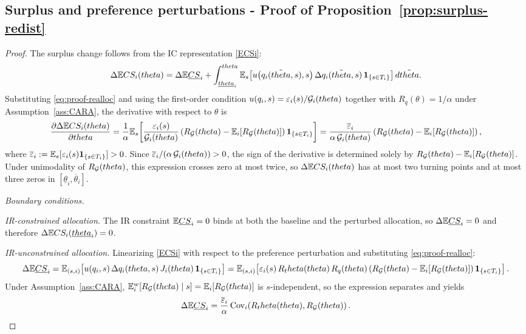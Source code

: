 \documentclass{class}
\begin{document}
\subsection{Surplus and preference perturbations - Proof of Proposition~\ref{prop:surplus-redist}}\label{proof:surplus-redist}


\begin{proof}
    
The surplus change follows from the IC representation \ref{ECSi}:
\[\Delta \mathbb{E} CS_i(theta) = \Delta\mathbb{E}\underline{CS}_i + \int_{\underline{theta}_i}^{theta}\mathbb{E}_s\!\left[u\!\left(q_i(\tilde{theta},s),s\right)\Delta q_i(\tilde{theta},s)\,\mathbf{1}_{\{s\in T_i\}}\right]d\tilde{theta}.\]
Substituting \ref{eq:proof-realloc} and using the first-order condition $u(q_i,s)=\varepsilon_i(s)/\mathcal{G}_i(theta)$ together with $R_q(\theta)=1/\alpha$ under Assumption~\ref{ass:CARA}, the derivative with respect to $\theta$ is
\[\frac{\partial\Delta \mathbb{E} CS_i(theta)}{\partial theta} = \frac{1}{\alpha}\mathbb{E}_s\!\left[\frac{\varepsilon_i(s)}{\mathcal{G}_i(theta)}\left(R_{\mathcal{G}}(theta)-\mathbb{E}_i[R_{\mathcal{G}}(theta)]\right)\mathbf{1}_{\{s\in T_i\}}\right] = \frac{\overline\varepsilon_i}{\alpha\,\mathcal{G}_i(theta)}\left(R_{\mathcal{G}}(theta)-\mathbb{E}_i[R_{\mathcal{G}}(theta)]\right),\]
where $\overline\varepsilon_i:=\mathbb{E}_s[\varepsilon_i(s)\mathbf{1}_{\{s\in T_i\}}]>0$. Since $\overline\varepsilon_i/(\alpha\,\mathcal{G}_i(theta))>0$, the sign of the derivative is determined solely by $R_{\mathcal{G}}(theta)-\mathbb{E}_i[R_{\mathcal{G}}(theta)]$. Under unimodality of $R_{\mathcal{G}}(theta)$, this expression crosses zero at most twice, so $\Delta \mathbb{E} CS_i(theta)$ has at most two turning points and at most three zeros in $[\underline\theta_i,\overline\theta_i]$.

\noindent\textit{Boundary conditions.}

\noindent\textit{IR-constrained allocation.} The IR constraint $\mathbb{E}\underline{CS}_i=0$ binds at both the baseline and the perturbed allocation, so $\Delta\mathbb{E}\underline{CS}_i=0$ and therefore $\Delta \mathbb{E} CS_i(\underline{theta}_i)=0$.

\noindent\textit{IR-unconstrained allocation.} Linearizing \ref{ECSi} with respect to the preference perturbation and substituting \ref{eq:proof-realloc}:
\[\Delta\mathbb{E}\underline{CS}_i = \mathbb{E}_{(s,i)}\!\left[u\!\left(q_i,s\right)\Delta q_i(theta,s)\,J_i(theta)\,\mathbf{1}_{\{s\in T_i\}}\right] = \mathbb{E}_{(s,i)}\!\left[\varepsilon_i(s)\,R_theta(theta)\,R_q(theta)\left(R_{\mathcal{G}}(theta)-\mathbb{E}_i[R_{\mathcal{G}}(theta)]\right)\mathbf{1}_{\{s\in T_i\}}\right].\]
Under Assumption~\ref{ass:CARA}, $\mathbb{E}_i^w[R_{\mathcal{G}}(theta)\mid s]=\mathbb{E}_i[R_{\mathcal{G}}(theta)]$ is $s$-independent, so the expression separates and yields
\[\Delta\mathbb{E}\underline{CS}_i = \frac{\overline\varepsilon_i}{\alpha}\,\mathrm{Cov}_{i}\!\left(R_theta(theta),R_{\mathcal{G}}(theta)\right).\]


\end{proof}
\end{document}

